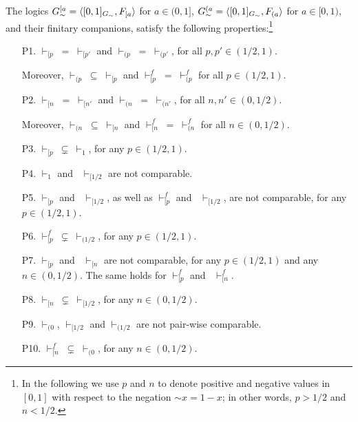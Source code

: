 \documentclass[10pt,a4paper]{amsart}
\newcommand{\ninv}{\mathord{\sim}}
\begin{document}
\begin{proposition}
The logics ${\rm G}^{[a}_\sim = \langle [0,1]_{\rm{G}_\sim}, F_{[a}\rangle$ for $a \in (0, 1]$,  ${\rm G}^{(a}_\sim=\langle [0,1]_{\rm{G}_\sim}, F_{(a} \rangle$ for $a \in [0, 1)$, and their finitary companions, satisfy the following properties:\footnote{In the following we use $p$ and $n$ to denote positive and negative values in $[0, 1]$ with respect to the negation $\ninv x = 1-x$; in other words, $p > 1/2$ and $n < 1/2$.}
\begin{enumerate}
\item[P1.] $\vdash_{[p} \; = \; \vdash_{[p'}$ and $\vdash_{(p} \; = \; \vdash_{(p'}$, for all $p, p' \in (1/2, 1)$.

Moreover, $\vdash_{(p} \; \subseteq \; \vdash_{[p}$ and $\vdash^f_{[p} \; = \; \vdash^f_{(p}$ for all $p \in (1/2, 1)$.


\item[P2.] $\vdash_{[n} \; = \; \vdash_{[n'}$ and $\vdash_{(n} \; = \; \vdash_{(n'}$, for all $n, n' \in (0, 1/2)$.

Moreover, $\vdash_{(n} \; \subseteq \; \vdash_{[n}$ and $\vdash^f_{[n} \; = \; \vdash^f_{(n}$ for all $n \in (0, 1/2)$.

\item[P3.] $\vdash_{[p} ~\varsubsetneq ~\vdash_1$,  for any $p \in (1/2,1)$.

\item[P4.] $\vdash_1$ and ~$\vdash_{[1/2}$ are not comparable. 
\item[P5.] $\vdash_{[p}$ and ~$\vdash_{[1/2}$, as well as $\vdash^f_{[p}$ and ~$\vdash_{[1/2}$, are not comparable, for any $p \in (1/2,1)$. 
\item[P6.] $\vdash^f_{[p}  ~\varsubsetneq  ~\vdash_{(1/2}$,  for any $p \in (1/2,1)$.
\item[P7.] $\vdash_{[p}$ and ~$\vdash_{[n}$ are not comparable, for any $p \in (1/2,1)$ and any $n \in (0,1/2)$. The same holds for $\vdash^f_{[p}$ and ~$\vdash^f_{[n}$. 
\item[P8.]  $\vdash_{[n} ~\varsubsetneq ~\vdash_{[1/2}$,  for any $n \in (0,1/2)$. 
\item[P9.] $\vdash_{(0}$, $\vdash_{[1/2}$ and $\vdash_{(1/2}$ are not pair-wise comparable. 
\item[P10.]  $\vdash^f_{[n}  \; \varsubsetneq  \; \vdash_{(0}$, for any $n \in (0, 1/2)$.

\end{enumerate}
\end{proposition}
\end{document}
